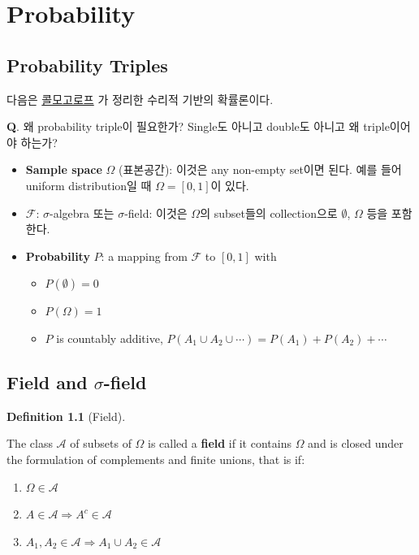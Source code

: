 \documentclass[
  13pt,
  letterpaper,
  DIV=11,
  numbers=noendperiod]{scrreprt}
\providecommand{\tightlist}{%
  \setlength{\itemsep}{0pt}\setlength{\parskip}{0pt}}\usepackage{longtable,booktabs,array}
\theoremstyle{definition}
\newtheorem{definition}{Definition}[chapter]
\theoremstyle{plain}
\theoremstyle{definition}
\theoremstyle{plain}
\theoremstyle{plain}
\theoremstyle{definition}
\theoremstyle{remark}
\begin{document}
\chapter{Probability}\label{probability-1}

\section{Probability Triples}\label{probability-triples}

다음은
\href{https://en.wikipedia.org/wiki/Andrey_Kolmogorov}{콜모고로프} 가
정리한 수리적 기반의 확률론이다.

\textbf{Q}. 왜 probability triple이 필요한가? Single도 아니고 double도
아니고 왜 triple이어야 하는가?

\begin{itemize}
\item
  \textbf{Sample space} \(\Omega\) (표본공간): 이것은 any non-empty
  set이면 된다. 예를 들어 uniform distribution일 때 \(\Omega = [0,1]\)이
  있다.
\item
  \(\mathcal{F}\): \(\sigma\)-algebra 또는 \(\sigma\)-field: 이것은
  \(\Omega\)의 subset들의 collection으로 \(\emptyset\), \(\Omega\) 등을
  포함한다.
\item
  \textbf{Probability} \(P\): a mapping from \(\mathcal{F}\) to
  \([0,1]\) with

  \begin{itemize}
  \tightlist
  \item
    \(P(\emptyset)=0\)
  \item
    \(P(\Omega)=1\)
  \item
    \(P\) is countably additive,
    \(P(A_1 \cup A_2 \cup \cdots) = P(A_1) + P(A_2) + \cdots\)
  \end{itemize}
\end{itemize}

\section{\texorpdfstring{Field and
\(\sigma\)-field}{Field and \textbackslash sigma-field}}\label{field-and-sigma-field}

\begin{definition}[Field]\protect\hypertarget{def-field}{}\label{def-field}

The class \(\mathcal{A}\) of subsets of \(\Omega\) is called a
\textbf{field} if it contains \(\Omega\) and is closed under the
formulation of complements and finite unions, that is if:

\begin{enumerate}
\def\labelenumi{\arabic{enumi}.}
\item
  \(\Omega \in \mathcal{A}\)
\item
  \(A\in\mathcal{A} \Longrightarrow A^c \in \mathcal{A}\)
\item
  \(A_1, A_2 \in \mathcal{A} \Longrightarrow A_1 \cup A_2 \in \mathcal{A}\)
\end{enumerate}

\end{definition}
\end{document}
